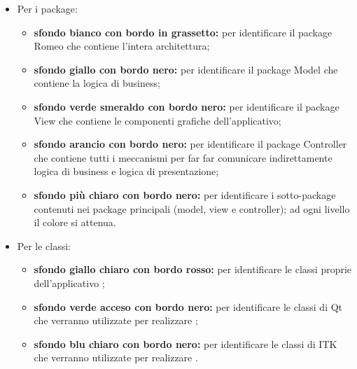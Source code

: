\begin{itemize}
\item Per i package\g{}:
\begin{itemize}
\item \textbf{sfondo bianco con bordo in grassetto:} per identificare il package\g{} Romeo che contiene l'intera architettura;
\item \textbf{sfondo giallo con bordo nero:} per identificare il package\g{} Model che contiene la logica di business; 
\item \textbf{sfondo verde smeraldo con bordo nero:} per identificare il package\g{} View che contiene le componenti grafiche dell'applicativo;
\item \textbf{sfondo arancio con bordo nero:} per identificare il package\g{} Controller che contiene tutti i meccanismi per far far comunicare indirettamente logica di business e logica di presentazione;
\item \textbf{sfondo più chiaro con bordo nero:} per identificare i sotto-package\g{} contenuti nei package\g{} principali (model, view e controller); ad ogni livello il colore si attenua.
\end{itemize}
\item Per le classi:
\begin{itemize}
	\item \textbf{sfondo giallo chiaro con bordo rosso:} per identificare le classi proprie dell'applicativo \project{};
	\item \textbf{sfondo verde acceso con bordo nero:} per identificare le classi di Qt\g{} che verranno utilizzate per realizzare \project{};
	\item \textbf{sfondo blu chiaro con bordo nero:} per identificare le classi di ITK\g{} che verranno utilizzate per realizzare \project{}.
\end{itemize}
\end{itemize}

\pagebreak

